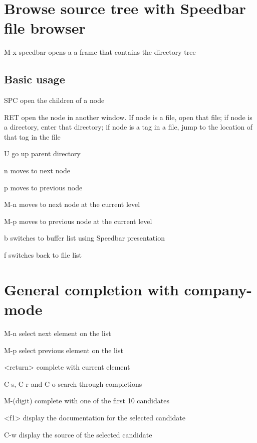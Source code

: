 \documentclass[10pt]{article}
\begin{document}
\begin{multicols}{3}
\section{Browse source tree with Speedbar file browser}

\begin{ttdesc}[labelwidth=\widthof{\texttt{report}}]
\item[M-x speedbar] opens a a frame that contains the directory tree
\end{ttdesc}

\subsection{Basic usage}
\begin{ttdesc}[labelwidth=\widthof{\texttt{report}}]
\item[SPC] open the children of a node
\item[RET] open the node in another window. If node is a file, open that file; if node is a directory, enter that directory; if node is a tag in a file, jump to the location of that tag in the file
\item[U] go up parent directory
\item[n] moves to next node
\item[p] moves to previous node
\item[M-n] moves to next node at the current level
\item[M-p] moves to previous node at the current level
\item[b] switches to buffer list using Speedbar presentation
\item[f] switches back to file list
\end{ttdesc}

\section{General completion with company-mode}
\begin{ttdesc}[labelwidth=\widthof{\texttt{report}}]
\item[M-n] select next element on the list
\item[M-p] select previous element on the list
\item[<return>] complete with current element
\item[C-s, C-r and C-o] search through completions
\item[M-(digit)] complete with one of the first 10 candidates
\item[<f1>] display the documentation for the selected candidate
\item[C-w] display the source of the selected candidate
\end{ttdesc}


\end{multicols}
\end{document}
